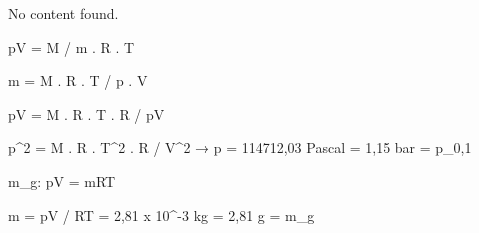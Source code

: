 No content found.

pV = M / m . R . T

m = M . R . T / p . V

pV = M . R . T . R / pV

p^2 = M . R . T^2 . R / V^2 → p = 114712,03 Pascal = 1,15 bar = p_0,1

m_g: pV = mRT

m = pV / RT = 2,81 x 10^-3 kg = 2,81 g = m_g